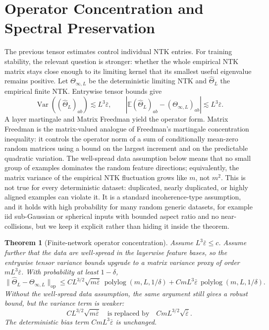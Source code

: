 \documentclass{article}
\newtheorem{theorem}{Theorem}[section]
\newcommand{\E}{\mathbb E}
\newcommand{\Var}{\operatorname{Var}}
\newcommand{\op}{\mathrm{op}}
\newcommand{\wh}{\widehat}
\newcommand{\barE}{\bar\varepsilon}
\begin{document}
\section{Operator Concentration and Spectral Preservation}
The previous tensor estimates control individual NTK entries. For training stability, the relevant question is stronger: whether the whole empirical NTK matrix stays close enough to its limiting kernel that its smallest useful eigenvalue remains positive.
Let \(\Theta_{\infty,L}\) be the deterministic limiting NTK and \(\wh\Theta_L\) the empirical finite NTK. Entrywise tensor bounds give
\begin{equation}
\Var((\wh\Theta_L)_{ab})\lesssim L^3\barE,
\qquad
|\E(\wh\Theta_L)_{ab}-(\Theta_{\infty,L})_{ab}|\lesssim L^3\barE.
\end{equation}
A layer martingale and Matrix Freedman yield the operator form. Matrix Freedman is the matrix-valued analogue of Freedman's martingale concentration inequality: it controls the operator norm of a sum of conditionally mean-zero random matrices using a bound on the largest increment and on the predictable quadratic variation. The well-spread data assumption below means that no small group of examples dominates the random feature directions; equivalently, the matrix variance of the empirical NTK fluctuation grows like \(m\), not \(m^2\). This is not true for every deterministic dataset: duplicated, nearly duplicated, or highly aligned examples can violate it. It is a standard incoherence-type assumption, and it holds with high probability for many random generic datasets, for example iid sub-Gaussian or spherical inputs with bounded aspect ratio and no near-collisions, but we keep it explicit rather than hiding it inside the theorem.

\begin{theorem}[Finite-network operator concentration]
\label{thm:operator}
Assume \(L^3\barE\le c\). Assume further that the data are well-spread in the layerwise feature bases, so the entrywise tensor variance bounds upgrade to a matrix variance proxy of order \(mL^3\barE\). With probability at least \(1-\delta\),
\begin{equation}
\|\wh\Theta_L-\Theta_{\infty,L}\|_{\op}
\le
C L^{3/2}\sqrt{m\barE}\,\operatorname{polylog}(m,L,1/\delta)
+C mL^3\barE\,\operatorname{polylog}(m,L,1/\delta).
\label{eq:operator-bound}
\end{equation}
Without the well-spread data assumption, the same argument still gives a robust bound, but the variance term is weaker:
\[
C L^{3/2}\sqrt{m\barE}
\quad\text{is replaced by}\quad
C mL^{3/2}\sqrt{\barE}.
\]
The deterministic bias term \(C mL^3\barE\) is unchanged.
\end{theorem}
\end{document}
